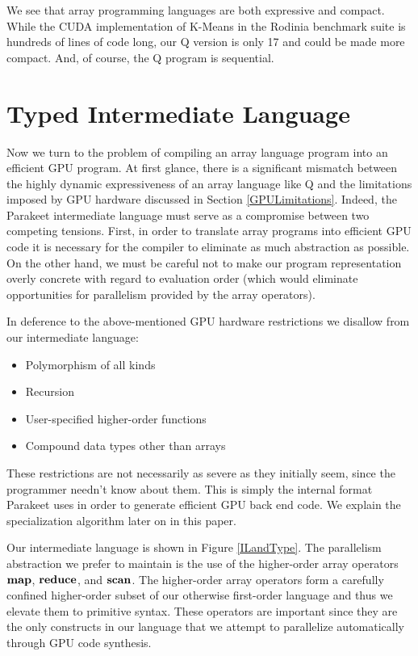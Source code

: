 \documentclass[preprint]{sigplanconf}
\begin{document}
We see that array programming languages are both expressive and compact.  While the CUDA implementation of K-Means in the Rodinia benchmark suite is hundreds of lines of code long, our Q version is only 17 and could be made more compact. And, of course, the Q program is sequential.

\section{Typed Intermediate Language}
Now we turn to the problem
of compiling an array language program into an efficient GPU program.
At first glance, there is a significant mismatch between the highly dynamic
expressiveness of an array language like Q and the limitations imposed by GPU
hardware discussed in Section \ref{GPULimitations}. Indeed, the Parakeet
intermediate language must serve as a compromise between two competing tensions.
First, in order to translate array programs into efficient GPU code it is
necessary for the compiler to eliminate as much abstraction as possible. On the
other hand, we must be careful not to make our program representation overly
concrete with regard to evaluation order (which would eliminate opportunities
for parallelism provided by the array operators).

In deference to the above-mentioned GPU hardware restrictions we disallow from
our intermediate language:

\begin{itemize}
\item Polymorphism of all kinds
\item Recursion
\item User-specified higher-order functions
\item Compound data types other than arrays
\end{itemize}

These restrictions are not necessarily as severe as they initially seem, since
the programmer needn't know about them.
This is simply the internal format Parakeet uses in
order to generate efficient GPU back end code. We explain the
specialization algorithm later on in this paper.

Our intermediate language is shown in Figure \ref{ILandType}. The parallelism
abstraction we prefer to maintain is the use of the higher-order array operators
$\mbox{\textbf{map}}$, $\mbox{\textbf{reduce}}$, and $\mbox{\textbf{scan}}$. The higher-order array operators
form a carefully confined higher-order subset of our otherwise first-order
language and thus we elevate them to primitive syntax. These operators are
important since they are the only constructs in our language that we attempt to
parallelize automatically through GPU code synthesis.
\end{document}
